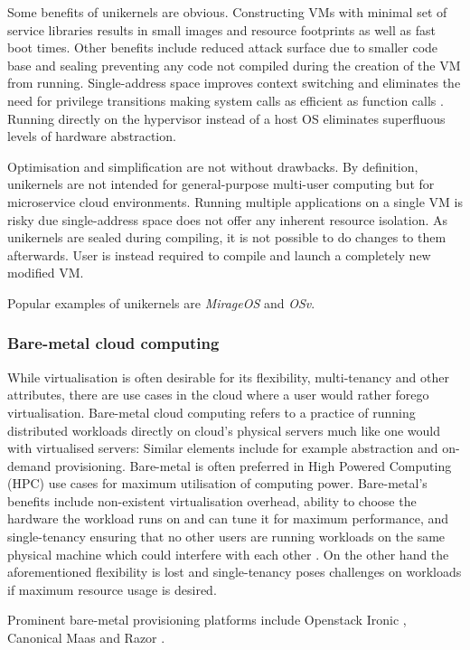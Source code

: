 Some benefits of unikernels are obvious. Constructing VMs with minimal set of service libraries results in small images and resource footprints as well as fast boot times. Other benefits include reduced attack surface due to smaller code base and sealing preventing any code not compiled during the creation of the VM from running. Single-address space improves context switching and eliminates the need for privilege transitions making system calls as efficient as function calls \cite{osv}. Running directly on the hypervisor instead of a host OS eliminates superfluous levels of hardware abstraction.

Optimisation and simplification are not without drawbacks. By definition, unikernels are not intended for general-purpose multi-user computing but for microservice cloud environments. Running multiple applications on a single VM is risky due single-address space does not offer any inherent resource isolation. As unikernels are sealed during compiling, it is not possible to do changes to them afterwards. User is instead required to compile and launch a completely new modified VM.

Popular examples of unikernels are \textit{MirageOS}\cite{mirage} and \textit{OSv}\cite{osv}.

\subsubsection{Bare-metal cloud computing}

While virtualisation is often desirable for its flexibility, multi-tenancy and other attributes, there are use cases in the cloud where a user would rather forego virtualisation. Bare-metal cloud computing refers to a practice of running distributed workloads directly on  cloud's physical servers much like one would with virtualised servers: Similar elements include for example abstraction and on-demand provisioning. Bare-metal is often preferred in High Powered Computing (HPC) use cases for maximum utilisation of computing power. Bare-metal's benefits include non-existent virtualisation overhead, ability to choose the hardware the workload runs on and can tune it for maximum performance, and single-tenancy ensuring that no other users are running workloads on the same physical machine which could interfere with each other \cite{baremetal}. On the other hand the aforementioned flexibility is lost and single-tenancy poses challenges on workloads if maximum resource usage is desired. 

Prominent bare-metal provisioning platforms include Openstack Ironic \cite{ironic}, Canonical Maas \cite{MaaS} and Razor \cite{razor}.

